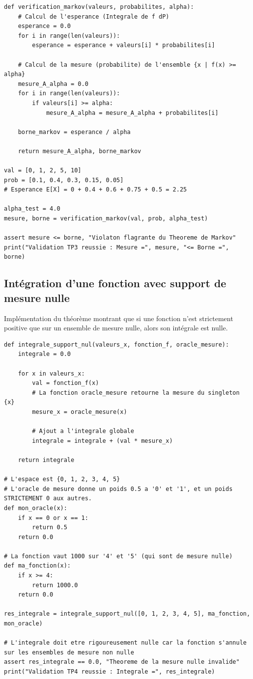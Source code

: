 \documentclass[11pt,a4paper]{article}
\begin{document}
\begin{lstlisting}
def verification_markov(valeurs, probabilites, alpha):
    # Calcul de l'esperance (Integrale de f dP)
    esperance = 0.0
    for i in range(len(valeurs)):
        esperance = esperance + valeurs[i] * probabilites[i]

    # Calcul de la mesure (probabilite) de l'ensemble {x | f(x) >= alpha}
    mesure_A_alpha = 0.0
    for i in range(len(valeurs)):
        if valeurs[i] >= alpha:
            mesure_A_alpha = mesure_A_alpha + probabilites[i]

    borne_markov = esperance / alpha

    return mesure_A_alpha, borne_markov

val = [0, 1, 2, 5, 10]
prob = [0.1, 0.4, 0.3, 0.15, 0.05]
# Esperance E[X] = 0 + 0.4 + 0.6 + 0.75 + 0.5 = 2.25

alpha_test = 4.0
mesure, borne = verification_markov(val, prob, alpha_test)

assert mesure <= borne, "Violaton flagrante du Theoreme de Markov"
print("Validation TP3 reussie : Mesure =", mesure, "<= Borne =", borne)
\end{lstlisting}


\subsection*{Int\'egration d'une fonction avec support de mesure nulle}

Impl\'ementation du th\'eor\`eme montrant que si une fonction n'est strictement positive que sur un ensemble de mesure nulle, alors son int\'egrale est nulle.

\begin{lstlisting}
def integrale_support_nul(valeurs_x, fonction_f, oracle_mesure):
    integrale = 0.0

    for x in valeurs_x:
        val = fonction_f(x)
        # La fonction oracle_mesure retourne la mesure du singleton {x}
        mesure_x = oracle_mesure(x)

        # Ajout a l'integrale globale
        integrale = integrale + (val * mesure_x)

    return integrale

# L'espace est {0, 1, 2, 3, 4, 5}
# L'oracle de mesure donne un poids 0.5 a '0' et '1', et un poids STRICTEMENT 0 aux autres.
def mon_oracle(x):
    if x == 0 or x == 1:
        return 0.5
    return 0.0

# La fonction vaut 1000 sur '4' et '5' (qui sont de mesure nulle)
def ma_fonction(x):
    if x >= 4:
        return 1000.0
    return 0.0

res_integrale = integrale_support_nul([0, 1, 2, 3, 4, 5], ma_fonction, mon_oracle)

# L'integrale doit etre rigoureusement nulle car la fonction s'annule sur les ensembles de mesure non nulle
assert res_integrale == 0.0, "Theoreme de la mesure nulle invalide"
print("Validation TP4 reussie : Integrale =", res_integrale)
\end{lstlisting}
\end{document}
